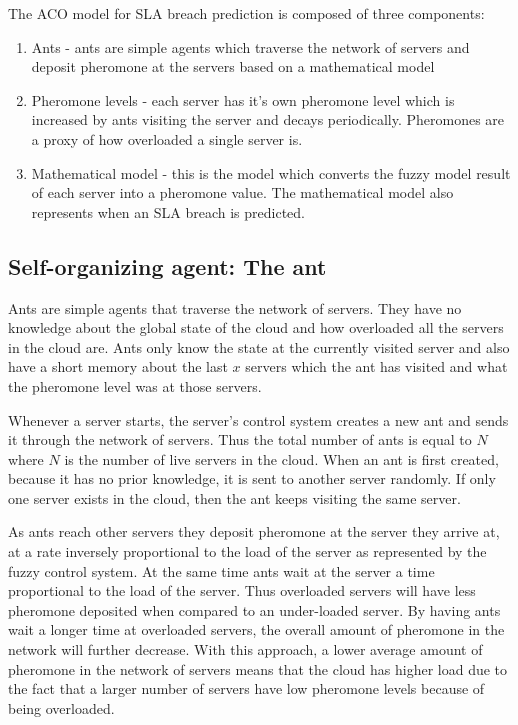 \documentclass[conference]{IEEEtran}
\begin{document}
The ACO model for SLA breach prediction is composed of three components:

\begin{enumerate}
	\item Ants - ants are simple agents which traverse the network of servers and deposit pheromone at the servers based on a mathematical model
	\item Pheromone levels - each server has it's own pheromone level which is increased by ants visiting the server and decays periodically. Pheromones are a proxy of how overloaded a single server is.
	\item Mathematical model - this is the model which converts the fuzzy model result of each server into a pheromone value. The mathematical model also represents when an SLA breach is predicted.
\end{enumerate}

\subsection{Self-organizing agent: The ant}

Ants are simple agents that traverse the network of servers. They have no knowledge about the global state of the cloud and how overloaded all the servers in the cloud are. Ants only know the state at the currently visited server and also have a short memory about the last $x$ servers which the ant has visited and what the pheromone level was at those servers.

Whenever a server starts, the server's control system creates a new ant and sends it through the network of servers. Thus the total number of ants is equal to $N$ where $N$ is the number of live servers in the cloud. When an ant is first created, because it has no prior knowledge, it is sent to another server randomly. If only one server exists in the cloud, then the ant keeps visiting the same server.

As ants reach other servers they deposit pheromone at the server they arrive at, at a rate inversely proportional to the load of the server as represented by the fuzzy control system. At the same time ants wait at the server a time proportional to the load of the server. Thus overloaded servers will have less pheromone deposited when compared to an under-loaded server. By having ants wait a longer time at overloaded servers, the overall amount of pheromone in the network will further decrease. With this approach, a lower average amount of pheromone in the network of servers means that the cloud has higher load due to the fact that a larger number of servers have low pheromone levels because of being overloaded.
\end{document}
